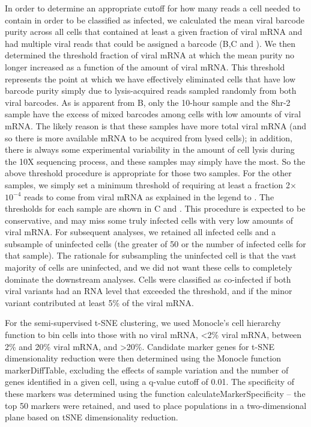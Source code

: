 \documentclass[9pt,lineno]{elife}
\begin{document}
In order to determine an appropriate cutoff for how many reads a cell needed to contain in order to be classified as infected, we calculated the mean viral barcode purity across all cells that contained at least a given fraction of viral mRNA and had multiple viral reads that could be assigned a barcode (B,C and ).
We then determined the threshold fraction of viral mRNA at which the mean purity no longer increased as a function of the amount of viral mRNA.
This threshold represents the point at which we have effectively eliminated cells that have low barcode purity simply due to lysis-acquired reads sampled randomly from both viral barcodes.
As is apparent from B, only the 10-hour sample and the 8hr-2 sample have the excess of mixed barcodes among cells with low amounts of viral mRNA.
The likely reason is that these samples have more total viral mRNA (and so there is more available mRNA to be acquired from lysed cells); in addition, there is always some experimental variability in the amount of cell lysis during the 10X sequencing process, and these samples may simply have the most.
So the above threshold procedure is appropriate for those two samples.
For the other samples, we simply set a minimum threshold of requiring at least a fraction 2$\times$$10^{-4}$ reads to come from viral mRNA as explained in the legend to .
The thresholds for each sample are shown in C and .
This procedure is expected to be conservative, and may miss some truly infected cells with very low amounts of viral mRNA.
For subsequent analyses, we retained all infected cells and a subsample of uninfected cells (the greater of 50 or the number of infected cells for that sample).
The rationale for subsampling the uninfected cell is that the vast majority of cells are uninfected, and we did not want these cells to completely dominate the downstream analyses.
Cells were classified as co-infected if both viral variants had an RNA level that exceeded the threshold, and if the minor variant contributed at least 5\% of the viral mRNA.

For the semi-supervised t-SNE clustering, we used Monocle's cell hierarchy function to bin cells into those with no viral mRNA, <2\% viral mRNA, between 2\% and 20\% viral mRNA, and >20\%. 
Candidate marker genes for t-SNE dimensionality reduction were then determined using the Monocle function markerDiffTable, excluding the effects of sample variation and the number of genes identified in a given cell, using a q-value cutoff of 0.01.
The specificity of these markers was determined using the function calculateMarkerSpecificity -- the top 50 markers were retained, and used to place populations in a two-dimensional plane based on tSNE dimensionality reduction.
\end{document}
